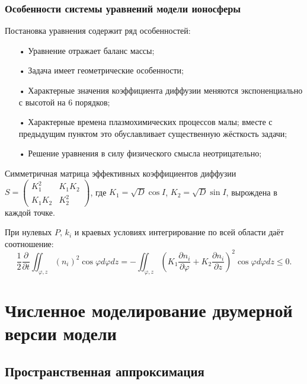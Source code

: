 \documentclass[9pt, apectratio=43,unicode]{beamer}
\begin{document}
\begin{frame}\frametitle{Особенности системы уравнений модели ионосферы}

Постановка уравнения содержит ряд особенностей:
\begin{itemize}
\item[•] Уравнение отражает баланс массы;
\item[•] Задача имеет геометрические особенности;
\item[•] Характерные значения коэффициента диффузии меняются экспоненциально с высотой на $6$ порядков;
\item[•] Характерные времена плазмохимических процессов малы; вместе с предыдущим пунктом это обуславливает существенную жёсткость задачи;
\item[•] Решение уравнения в силу физического смысла неотрицательно;
\end{itemize}

Симметричная матрица эффективных коэффициентов диффузии $S = \begin{pmatrix}K_1^2 & K_1K_2 \\
K_1K_2 & K_2^2 \end{pmatrix}$, где $K_1 = \sqrt{D}\cos I$, $K_2 = \sqrt{D}\sin I$, вырождена в каждой точке. 

При нулевых $P$, $k_i$ и краевых условиях интегрирование по всей области даёт соотношение: 
$$\dfrac{1}{2}\dfrac{\partial}{\partial t} \iint_{\varphi, z} (n_i)^2 \cos\varphi d\varphi dz = - \iint_{\varphi, z}\left(K_1 \dfrac{\partial n_i}{\partial\varphi} + K_2\dfrac{\partial n_i}{\partial z}\right)^2 \cos \varphi d\varphi dz \leq 0.$$

\end{frame}


\section{Численное моделирование двумерной версии модели}

\subsection{Пространственная аппроксимация}
\end{document}
